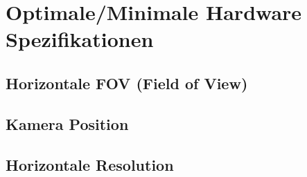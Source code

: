 \section{Optimale/Minimale Hardware Spezifikationen}

\lipsum[9]

\subsection{Horizontale FOV (Field of View)}

\subsection{Kamera Position}

\subsection{Horizontale Resolution}
